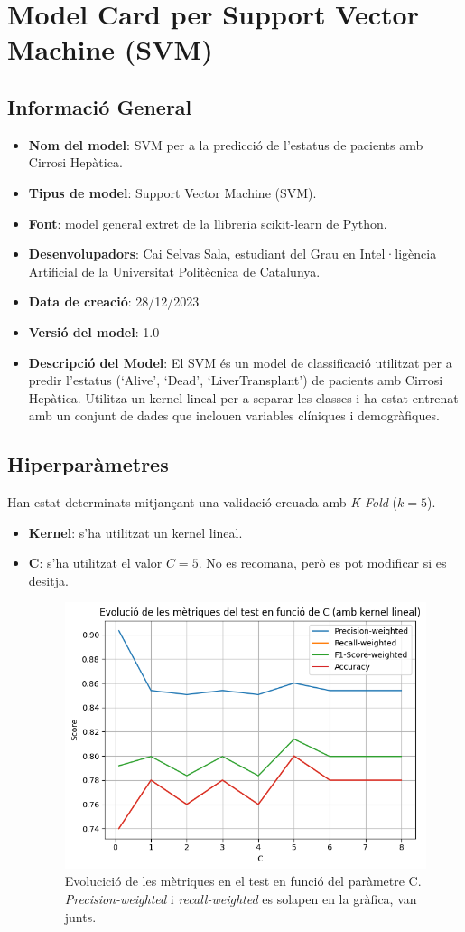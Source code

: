 \section{Model Card per Support Vector Machine (SVM)}

\subsection{Informació General}
\begin{itemize}

\item \textbf{Nom del model}: SVM per a la predicció de l'estatus de pacients amb Cirrosi Hepàtica.
\item \textbf{Tipus de model}: Support Vector Machine (SVM).
\item \textbf{Font}: model general extret de la llibreria scikit-learn de Python.
\item \textbf{Desenvolupadors}: Cai Selvas Sala, estudiant del Grau en Intel·ligència Artificial de la Universitat Politècnica de Catalunya.
\item \textbf{Data de creació}: 28/12/2023
\item \textbf{Versió del model}: 1.0
\item \textbf{Descripció del Model}: El SVM és un model de classificació utilitzat per a predir l'estatus (`Alive', `Dead', `LiverTransplant') de pacients amb Cirrosi Hepàtica. Utilitza un kernel lineal per a separar les classes i ha estat entrenat amb un conjunt de dades que inclouen variables clíniques i demogràfiques.
\end{itemize}

\subsection{Hiperparàmetres}
Han estat determinats mitjançant una validació creuada amb \textit{K-Fold} ($k = 5$).
\begin{itemize}
	\item \textbf{Kernel}: s'ha utilitzat un kernel lineal.
	\item \textbf{C}: s'ha utilitzat el valor $C = 5$. No es recomana, però es pot modificar si es desitja.
	\begin{figure}[H]
	\centering
	\includegraphics[width=0.5\linewidth]{img/c_evolution.png}
	\caption*{Evolucició de les mètriques en el test en funció del paràmetre C. \textit{Precision-weighted} i \textit{recall-weighted} es solapen en la gràfica, van junts.}
	\end{figure}
\end{itemize}

